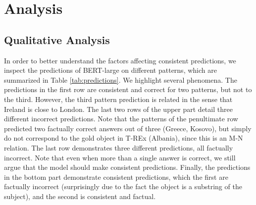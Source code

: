 \section{Analysis}
\label{sec:analysis}







\subsection{Qualitative Analysis}
In order to better understand the factors affecting consistent predictions, we inspect the predictions of BERT-large on different patterns, which are summarized in Table \ref{tab:predictions}.
We highlight several phenomena.
The predictions in the first row are consistent and correct for two patterns, but not to the third. However, the third pattern prediction is related in the sense that Ireland is close to London.
The last two rows of the upper part detail three different incorrect predictions. Note that the patterns of the penultimate row predicted two factually correct answers out of three (Greece, Kosovo), but simply do not correspond to the gold object in T-REx (Albania), since this is an M-N relation. The last row demonstrates three different predictions, all factually incorrect. Note that even when more than a single answer is correct, we still argue that the model should make consistent predictions.
Finally, the predictions in the bottom part demonstrate consistent predictions, which the first are factually incorrect (surprisingly due to the fact the object is a substring of the subject), and the second is consistent and factual.





